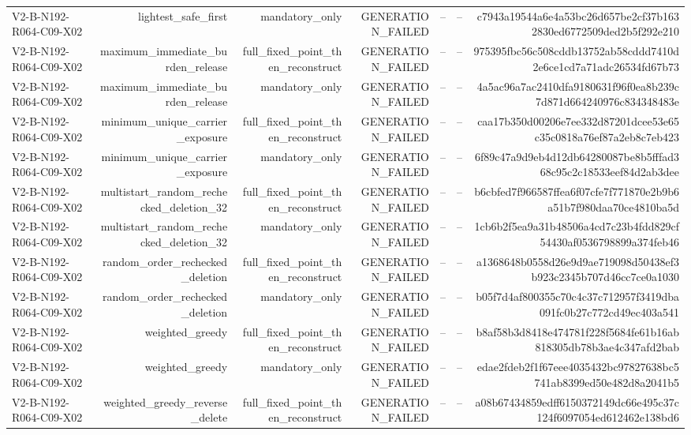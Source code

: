 {\begin{longtable}{lrrrrrr}
V2-B-N192-R064-C09-X02 & lightest\_safe\_first & mandatory\_only & GENERATION\_FAILED & -- & -- & c7943a19544a6e4a53bc26d657be2cf37b1632830ed6772509ded2b5f292e210 \\
V2-B-N192-R064-C09-X02 & maximum\_immediate\_burden\_release & full\_fixed\_point\_then\_reconstruct & GENERATION\_FAILED & -- & -- & 975395fbc56c508cddb13752ab58cddd7410d2e6ce1cd7a71adc26534fd67b73 \\
V2-B-N192-R064-C09-X02 & maximum\_immediate\_burden\_release & mandatory\_only & GENERATION\_FAILED & -- & -- & 4a5ac96a7ac2410dfa9180631f96f0ea8b239c7d871d664240976c834348483e \\
V2-B-N192-R064-C09-X02 & minimum\_unique\_carrier\_exposure & full\_fixed\_point\_then\_reconstruct & GENERATION\_FAILED & -- & -- & caa17b350d00206e7ee332d87201dcee53e65c35c0818a76ef87a2eb8c7eb423 \\
V2-B-N192-R064-C09-X02 & minimum\_unique\_carrier\_exposure & mandatory\_only & GENERATION\_FAILED & -- & -- & 6f89c47a9d9eb4d12db64280087be8b5fffad368c95c2c18533eef84d2ab3dee \\
V2-B-N192-R064-C09-X02 & multistart\_random\_rechecked\_deletion\_32 & full\_fixed\_point\_then\_reconstruct & GENERATION\_FAILED & -- & -- & b6cbfed7f966587ffea6f07cfe7f771870e2b9b6a51b7f980daa70ce4810ba5d \\
V2-B-N192-R064-C09-X02 & multistart\_random\_rechecked\_deletion\_32 & mandatory\_only & GENERATION\_FAILED & -- & -- & 1cb6b2f5ea9a31b48506a4cd7c23b4fdd829cf54430af0536798899a374feb46 \\
V2-B-N192-R064-C09-X02 & random\_order\_rechecked\_deletion & full\_fixed\_point\_then\_reconstruct & GENERATION\_FAILED & -- & -- & a1368648b0558d26e9d9ae719098d50438ef3b923c2345b707d46cc7ce0a1030 \\
V2-B-N192-R064-C09-X02 & random\_order\_rechecked\_deletion & mandatory\_only & GENERATION\_FAILED & -- & -- & b05f7d4af800355c70c4c37c712957f3419dba091fc0b27c772cd49ec403a541 \\
V2-B-N192-R064-C09-X02 & weighted\_greedy & full\_fixed\_point\_then\_reconstruct & GENERATION\_FAILED & -- & -- & b8af58b3d8418e474781f228f5684fe61b16ab818305db78b3ae4c347afd2bab \\
V2-B-N192-R064-C09-X02 & weighted\_greedy & mandatory\_only & GENERATION\_FAILED & -- & -- & edae2fdeb2f1f67eee4035432bc97827638bc5741ab8399ed50e482d8a2041b5 \\
V2-B-N192-R064-C09-X02 & weighted\_greedy\_reverse\_delete & full\_fixed\_point\_then\_reconstruct & GENERATION\_FAILED & -- & -- & a08b67434859edff6150372149dc66e495c37c124f6097054ed612462e138bd6 \\

\end{longtable}}
